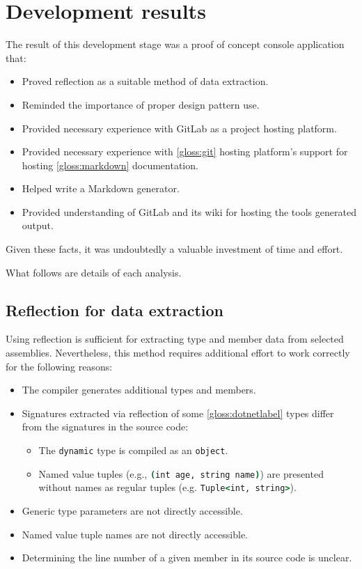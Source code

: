 \section{Development results}

The result of this development stage was a proof of concept console application that:
\begin{itemize}
    \item Proved reflection as a suitable method of data extraction.
    \item Reminded the importance of proper design pattern use.
    \item Provided necessary experience with GitLab as a project hosting platform.
    \item Provided necessary experience with \ref{gloss:git} hosting platform's support for hosting \ref{gloss:markdown} documentation.
    \item Helped write a Markdown generator.
    \item Provided understanding of GitLab and its wiki for hosting the tools generated output.
\end{itemize}

Given these facts, it was undoubtedly a valuable investment of time and effort.

What follows are details of each analysis.

\subsection{Reflection for data extraction}

Using reflection is sufficient for extracting type and member data from selected assemblies. Nevertheless, this method requires additional effort to work correctly for the following reasons:
\begin{itemize}
    \item The compiler generates additional types and members.
    \item Signatures extracted via reflection of some \ref{gloss:dotnetlabel} types differ from the signatures in the source code:
    \begin{itemize}
        \item The \lstinline[language=csh]{dynamic} type is compiled as an \lstinline[language=csh]{object}.
        \item Named value tuples (e.g., \lstinline[language=csh]{(int age, string name)}) are presented without names as regular tuples (e.g. \lstinline[language=csh]{Tuple<int, string>}).
    \end{itemize}
    \item Generic type parameters are not directly accessible.
    \item Named value tuple names are not directly accessible.
    \item Determining the line number of a given member in its source code is unclear.
\end{itemize}

